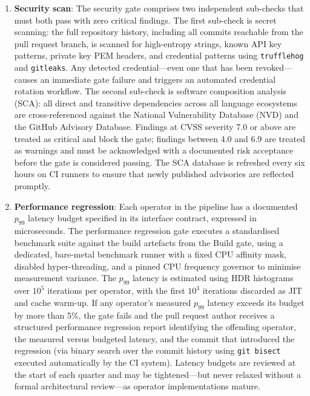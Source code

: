 \documentclass[12pt,openany]{book}
\numberwithin{equation}{chapter}
\theoremstyle{plain}
\theoremstyle{definition}
\theoremstyle{remark}
\begin{document}
\begin{enumerate}
    \item \textbf{Security scan}: The security gate comprises two independent
          sub-checks that must both pass with zero critical findings. The first
          sub-check is secret scanning: the full repository history, including all
          commits reachable from the pull request branch, is scanned for high-entropy
          strings, known API key patterns, private key PEM headers, and credential
          patterns using \texttt{trufflehog} and \texttt{gitleaks}. Any detected
          credential—even one that has been revoked—causes an immediate gate failure
          and triggers an automated credential rotation workflow. The second sub-check
          is software composition analysis (SCA): all direct and transitive
          dependencies across all language ecosystems are cross-referenced against the
          National Vulnerability Database (NVD) and the GitHub Advisory Database.
          Findings at CVSS severity 7.0 or above are treated as critical and block
          the gate; findings between 4.0 and 6.9 are treated as warnings and must
          be acknowledged with a documented risk acceptance before the gate is
          considered passing. The SCA database is refreshed every six hours on CI
          runners to ensure that newly published advisories are reflected promptly.

    \item \textbf{Performance regression}: Each operator in the pipeline has a
          documented $p_{99}$ latency budget specified in its interface contract,
          expressed in microseconds. The performance regression gate executes a
          standardised benchmark suite against the build artefacts from the Build
          gate, using a dedicated, bare-metal benchmark runner with a fixed CPU
          affinity mask, disabled hyper-threading, and a pinned CPU frequency governor
          to minimise measurement variance. The $p_{99}$ latency is estimated using
          HDR histograms over $10^5$ iterations per operator, with the first $10^3$
          iterations discarded as JIT and cache warm-up. If any operator's measured
          $p_{99}$ latency exceeds its budget by more than 5\%, the gate fails and
          the pull request author receives a structured performance regression report
          identifying the offending operator, the measured versus budgeted latency,
          and the commit that introduced the regression (via binary search over the
          commit history using \texttt{git bisect} executed automatically by the CI
          system). Latency budgets are reviewed at the start of each quarter and
          may be tightened—but never relaxed without a formal architectural review—as
          operator implementations mature.


\end{enumerate}
\end{document}
